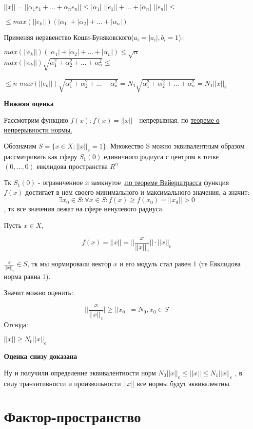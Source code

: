 \documentclass[12pt, english]{article}
\begin{document}
	$||x|| = || \alpha_1 e_1 + ... + \alpha_n e_n|| \leq |\alpha_1|$ $||e_1|| + ... + |\alpha_n|$ $||e_n|| \leq $
	
	$\leq max(||e_k||) (|\alpha_1| + |\alpha_2| + ...+ |\alpha_n|)$
	
	Применяя неравенство Коши-Буняковского($a_i = |a_i|, b_i = 1$):
			
	$max(||e_k||) (|\alpha_1| + |\alpha_2| + ...+ |\alpha_n|) \leq  \sqrt{n}$ $max(||e_k||)\sqrt{\alpha_1^2 + \alpha_2^2 + ... +\alpha_n^2  } \leq$
	
	$\leq n $ $max(||e_k||)\sqrt{\alpha_1^2 + \alpha_2^2 + ... +\alpha_n^2  } = N_1\sqrt{\alpha_1^2 + \alpha_2^2 + ... +\alpha_n^2  } = N_1 ||x||_e$

\textbf{Нижняя оценка}

		Рассмотрим функцию $f(x): f(x) = ||x||$ - непрерывная, по \hyperref[eq100]{теореме о непрерывности нормы.}
		
		 Обозначим $S = \{ x \in X : ||x||_e = 1 \}$. Множество S можно эквивалентным образом рассматривать как сферу $S_1(0)$ единичного радиуса с центром в
точке $(0,..., 0)$ евклидова пространства $R^n$

	Тк $S_1(0)$ - ограниченное и замкнутое ,\hyperref[eq202]{по теореме Вейерштрасса} функция $f(x)$ достигает в нем
	своего минимального и максимального значения, а значит:
	$$\exists x_0 \in S: \forall x \in S: f(x) \ge f(x_0) = ||x_0|| > 0$$, тк все значения лежат на сфере ненулевого радиуса.
		
		Пусть $x \in X$, 
		
		$$f(x) = ||x|| = ||\frac{x}{||x||_e}|| \cdot ||x||_e $$
		
		$\frac{x}{||x||_e} \in S$, тк мы нормировали вектор $x$ и его модуль стал равен 1 (те Евклидова норма равна 1).
		
	Значит можно оценить:
		 
	$$||\frac{x}{||x||_e}| \ge ||x_0|| = N_0, x_0 \in S$$
	Отсюда:
		 
	$||x|| \ge N_0 ||x||_e$
		 
 	\textbf{Оценка снизу доказана}
		
	Ну и получили определение эквивалентности норм
	$N_0||x||_e \leq ||x|| \leq N_1||x||_e$
	, в силу транзитивности и произвольности $||x||$ все нормы будут эквивалентны.

\section{Фактор-пространство}
\end{document}
